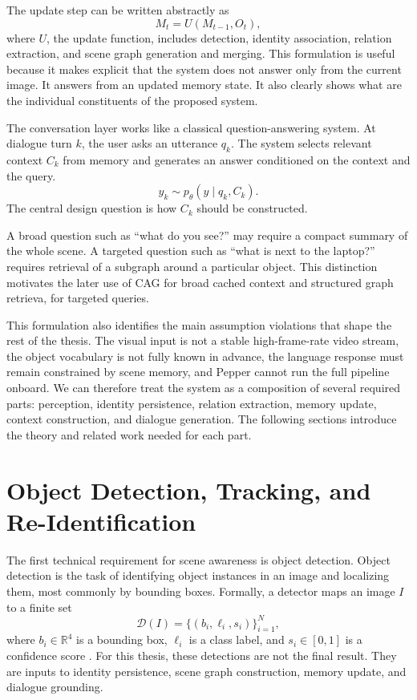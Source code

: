 The update step can be written abstractly as
\[
M_t = U(M_{t-1}, O_t),
\]
where \(U\), the update function, includes detection, identity association, relation extraction, and scene graph generation and merging. This formulation is useful because it makes explicit that the system does not answer only from the current image. It answers from an updated memory state. It also clearly shows what are the individual constituents of the proposed system.

The conversation layer works like a classical question-answering system. At dialogue turn \(k\), the user asks an utterance \(q_k\). The system selects relevant context \(C_k\) from memory and generates an answer conditioned on the context and the query.
\[
y_k \sim p_\theta(y\mid q_k,C_k).
\]
The central design question is how \(C_k\) should be constructed.

A broad question such as \enquote{what do you see?} may require a compact summary of the whole scene. A targeted question such as \enquote{what is next to the laptop?} requires retrieval of a subgraph around a particular object. This distinction motivates the later use of CAG for broad cached context and structured graph retrieva, for targeted queries.

This formulation also identifies the main assumption violations that shape the rest of the thesis. The visual input is not a stable high-frame-rate video stream, the object vocabulary is not fully known in advance, the language response must remain constrained by scene memory, and Pepper cannot run the full pipeline onboard. We can therefore treat the system as a composition of several required parts: perception, identity persistence, relation extraction, memory update, context construction, and dialogue generation. The following sections introduce the theory and related work needed for each part.

\section{Object Detection, Tracking, and Re-Identification}\label{sec:object-detection-tracking-reid}

The first technical requirement for scene awareness is object detection. Object detection is the task of identifying object instances in an image and localizing them, most commonly by bounding boxes. Formally, a detector maps an image \(I\) to a finite set
\[
\mathcal{D}(I)=\{(b_i,\ell_i,s_i)\}_{i=1}^{N},
\]
where \(b_i\in\mathbb{R}^4\) is a bounding box, \(\ell_i\) is a class label, and \(s_i\in[0,1]\) is a confidence score \cite[Part XIII]{foundationsCVbook}. For this thesis, these detections are not the final result. They are inputs to identity persistence, scene graph construction, memory update, and dialogue grounding.

